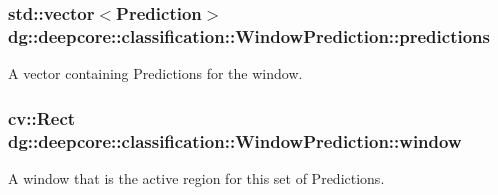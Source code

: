 \subsubsection[{\texorpdfstring{predictions}{predictions}}]{\setlength{\rightskip}{0pt plus 5cm}std\+::vector$<$Prediction$>$ dg\+::deepcore\+::classification\+::\+Window\+Prediction\+::predictions}\hypertarget{group___classification_module_gaaec179dc0e22d9c897260b650c2a6b82}{}\label{group___classification_module_gaaec179dc0e22d9c897260b650c2a6b82}


A vector containing Predictions for the window. 

\subsubsection[{\texorpdfstring{window}{window}}]{\setlength{\rightskip}{0pt plus 5cm}cv\+::\+Rect dg\+::deepcore\+::classification\+::\+Window\+Prediction\+::window}\hypertarget{group___classification_module_ga200902328358f2246a5e62d390e57278}{}\label{group___classification_module_ga200902328358f2246a5e62d390e57278}


A window that is the active region for this set of Predictions. 

